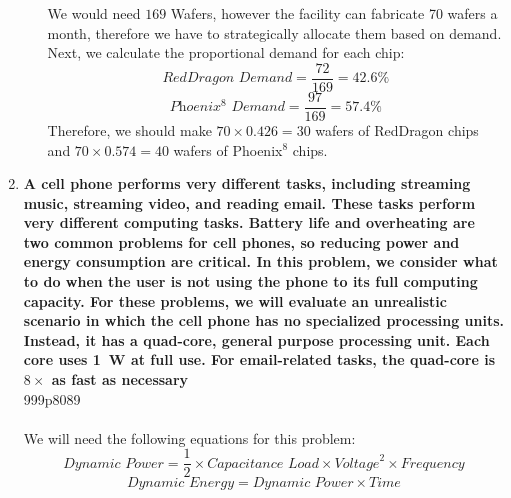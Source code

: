 \begin{enumerate}
\begin{enumerate}
\begin{equation*}
                    \end{equation*}
                    We would need $169$ Wafers, however the facility can fabricate 70 wafers a month, therefore we have to strategically allocate them based on demand. \\
                    Next, we calculate the proportional demand for each chip:
                    \begin{equation*}
                        \textit{RedDragon Demand} = \frac{72}{169} = 42.6\%
                    \end{equation*}
                    \begin{equation*}
                        \textit{Phoenix$^{8}$ Demand} = \frac{97}{169} = 57.4\%
                    \end{equation*}
                    Therefore, we should make $70 \times 0.426 = 30$ wafers of RedDragon chips and $70 \times 0.574 = 40$ wafers of Phoenix$^{8}$ chips.


          \end{enumerate}
    \item \textbf{A cell phone performs very different tasks, including streaming music, streaming video, and reading email. These tasks perform very different computing tasks. Battery life and overheating are two common problems for cell phones, so reducing power and energy consumption are critical. In this problem, we consider what to do when the user is not using the phone to its full computing capacity. For these problems, we will evaluate an unrealistic scenario in which the cell phone has no specialized processing units. Instead, it has a quad-core, general purpose processing unit. Each core uses \SI{1}{W} at full use. For email-related tasks, the quad-core is $8\times$ as fast as necessary} \\999p8089
           \\
          \\
          We will need the following equations for this problem:
          \begin{equation*}
              \textit{Dynamic Power} = \frac{1}{2} \times \textit{Capacitance Load} \times \textit{Voltage}^{2} \times \textit{Frequency}
          \end{equation*}
          \begin{equation*}
              \textit{Dynamic Energy} = \textit{Dynamic Power} \times \textit{Time}
          \end{equation*}


\end{enumerate}
